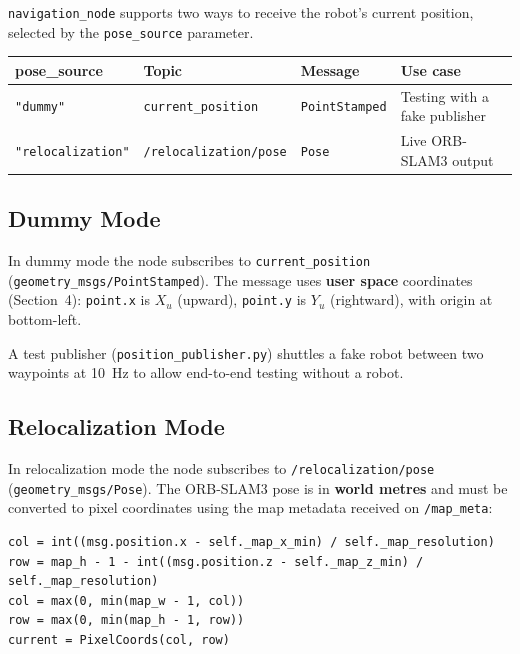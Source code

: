 \documentclass[12pt,a4paper]{article}
\begin{document}
\texttt{navigation\_node} supports two ways to receive the robot's current
position, selected by the \texttt{pose\_source} parameter.

\begin{center}
\begin{tabular}{llll}
\toprule
\textbf{pose\_source} & \textbf{Topic} & \textbf{Message} & \textbf{Use case} \\
\midrule
\texttt{"dummy"} & \texttt{current\_position} & \texttt{PointStamped} & Testing with a fake publisher \\
\texttt{"relocalization"} & \texttt{/relocalization/pose} & \texttt{Pose} & Live ORB-SLAM3 output \\
\bottomrule
\end{tabular}
\end{center}

\subsection{Dummy Mode}

In dummy mode the node subscribes to \texttt{current\_position}
(\texttt{geometry\_msgs/PointStamped}). The message uses \textbf{user space}
coordinates (Section~4): \texttt{point.x} is $X_u$ (upward), \texttt{point.y} is
$Y_u$ (rightward), with origin at bottom-left.

A test publisher (\texttt{position\_publisher.py}) shuttles a fake robot
between two waypoints at 10~Hz to allow end-to-end testing without a robot.

\subsection{Relocalization Mode}

In relocalization mode the node subscribes to
\texttt{/relocalization/pose} (\texttt{geometry\_msgs/Pose}).
The ORB-SLAM3 pose is in \textbf{world metres} and must be converted
to pixel coordinates using the map metadata received on \texttt{/map\_meta}:

\begin{lstlisting}[style=python, caption={World-to-pixel conversion in relocalization\_pose\_callback}]
col = int((msg.position.x - self._map_x_min) / self._map_resolution)
row = map_h - 1 - int((msg.position.z - self._map_z_min) / self._map_resolution)
col = max(0, min(map_w - 1, col))
row = max(0, min(map_h - 1, row))
current = PixelCoords(col, row)
\end{lstlisting}
\end{document}
